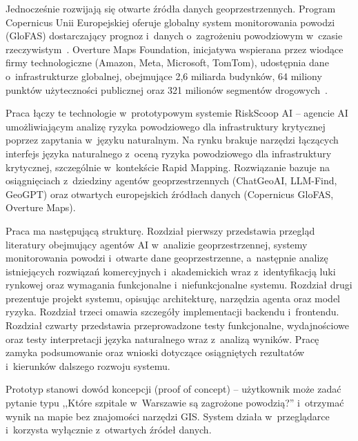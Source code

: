 Jednocześnie rozwijają się otwarte źródła danych geoprzestrzennych. Program Copernicus Unii Europejskiej oferuje globalny system monitorowania powodzi (GloFAS) dostarczający prognoz i~danych o~zagrożeniu powodziowym w~czasie rzeczywistym~\cite{jrc2020glofas}. Overture Maps Foundation, inicjatywa wspierana przez wiodące firmy technologiczne (Amazon, Meta, Microsoft, TomTom), udostępnia dane o~infrastrukturze globalnej, obejmujące 2,6 miliarda budynków, 64 miliony punktów użyteczności publicznej oraz 321 milionów segmentów drogowych~\cite{overture2024foundation}.

Praca łączy te technologie w~prototypowym systemie RiskScoop AI -- agencie AI umożliwiającym analizę ryzyka powodziowego dla infrastruktury krytycznej poprzez zapytania w~języku naturalnym. Na rynku brakuje narzędzi łączących interfejs języka naturalnego z~oceną ryzyka powodziowego dla infrastruktury krytycznej, szczególnie w~kontekście Rapid Mapping. Rozwiązanie bazuje na osiągnięciach z~dziedziny agentów geoprzestrzennych (ChatGeoAI, LLM-Find, GeoGPT) oraz otwartych europejskich źródłach danych (Copernicus GloFAS, Overture Maps).

Praca ma następującą strukturę. Rozdział pierwszy przedstawia przegląd literatury obejmujący agentów AI w~analizie geoprzestrzennej, systemy monitorowania powodzi i~otwarte dane geoprzestrzenne, a~następnie analizę istniejących rozwiązań komercyjnych i~akademickich wraz z~identyfikacją luki rynkowej oraz wymagania funkcjonalne i~niefunkcjonalne systemu. Rozdział drugi prezentuje projekt systemu, opisując architekturę, narzędzia agenta oraz model ryzyka. Rozdział trzeci omawia szczegóły implementacji backendu i~frontendu. Rozdział czwarty przedstawia przeprowadzone testy funkcjonalne, wydajnościowe oraz testy interpretacji języka naturalnego wraz z~analizą wyników. Pracę zamyka podsumowanie oraz wnioski dotyczące osiągniętych rezultatów i~kierunków dalszego rozwoju systemu.

Prototyp stanowi dowód koncepcji (proof of concept) -- użytkownik może zadać pytanie typu ,,Które szpitale w~Warszawie są zagrożone powodzią?'' i~otrzymać wynik na mapie bez znajomości narzędzi GIS. System działa w~przeglądarce i~korzysta wyłącznie z~otwartych źródeł danych.
